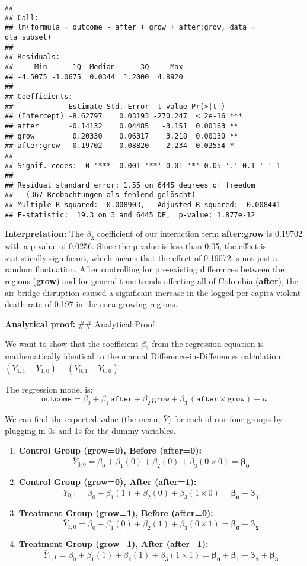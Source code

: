\documentclass[
]{article}
\begin{document}
\begin{verbatim}
## 
## Call:
## lm(formula = outcome ~ after + grow + after:grow, data = dta_subset)
## 
## Residuals:
##     Min      1Q  Median      3Q     Max 
## -4.5075 -1.0675  0.0344  1.2000  4.8920 
## 
## Coefficients:
##             Estimate Std. Error  t value Pr(>|t|)    
## (Intercept) -8.62797    0.03193 -270.247  < 2e-16 ***
## after       -0.14132    0.04485   -3.151  0.00163 ** 
## grow         0.20330    0.06317    3.218  0.00130 ** 
## after:grow   0.19702    0.08820    2.234  0.02554 *  
## ---
## Signif. codes:  0 '***' 0.001 '**' 0.01 '*' 0.05 '.' 0.1 ' ' 1
## 
## Residual standard error: 1.55 on 6445 degrees of freedom
##   (367 Beobachtungen als fehlend gelöscht)
## Multiple R-squared:  0.008903,   Adjusted R-squared:  0.008441 
## F-statistic:  19.3 on 3 and 6445 DF,  p-value: 1.877e-12
\end{verbatim}

\textbf{Interpretation:} The \(\beta_3\) coefficient of our interaction
term \textbf{after:grow} is 0.19702 with a p-value of 0.0256. Since the
p-value is less than 0.05, the effect is statistically significant,
which means that the effect of 0.19072 is not just a random fluctuation.
After controlling for pre-existing differences between the regions
(\textbf{grow}) and for general time trends affecting all of Colombia
(\textbf{after}), the air-bridge disruption caused a significant
increase in the logged per-capita violent death rate of 0.197 in the
coca growing regions.

\textbf{Analytical proof:} \#\# Analytical Proof

We want to show that the coefficient \(\beta_3\) from the regression
equation is mathematically identical to the manual
Difference-in-Differences calculation:
\((\bar{Y}_{1,1} - \bar{Y}_{1,0}) - (\bar{Y}_{0,1} - \bar{Y}_{0,0})\).

The regression model is: \[
\texttt{outcome} = \beta_0 + \beta_1\,\texttt{after} + \beta_2\,\texttt{grow} + \beta_3\,(\texttt{after}\times\texttt{grow}) + u
\]

We can find the expected value (the mean, \(\bar{Y}\)) for each of our
four groups by plugging in 0s and 1s for the dummy variables.

\begin{enumerate}
\def\labelenumi{\arabic{enumi}.}
\item
  \textbf{Control Group (grow=0), Before (after=0):} \[
  \bar{Y}_{0,0} = \beta_0 + \beta_1(0) + \beta_2(0) + \beta_3(0 \times 0) = \boldsymbol{\beta_0}
  \]
\item
  \textbf{Control Group (grow=0), After (after=1):} \[
  \bar{Y}_{0,1} = \beta_0 + \beta_1(1) + \beta_2(0) + \beta_3(1 \times 0) = \boldsymbol{\beta_0 + \beta_1}
  \]
\item
  \textbf{Treatment Group (grow=1), Before (after=0):} \[
  \bar{Y}_{1,0} = \beta_0 + \beta_1(0) + \beta_2(1) + \beta_3(0 \times 1) = \boldsymbol{\beta_0 + \beta_2}
  \]
\item
  \textbf{Treatment Group (grow=1), After (after=1):} \[
  \bar{Y}_{1,1} = \beta_0 + \beta_1(1) + \beta_2(1) + \beta_3(1 \times 1) = \boldsymbol{\beta_0 + \beta_1 + \beta_2 + \beta_3}
  \]
\end{enumerate}
\end{document}
